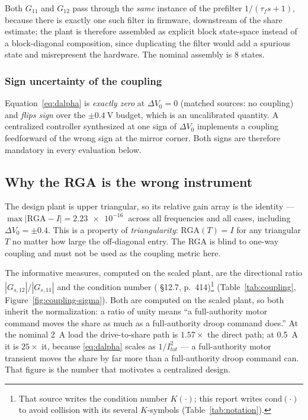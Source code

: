 \documentclass[energies,article,submit,pdftex,oneauthor]{Definitions/mdpi}
\begin{document}
Both $G_{11}$ and $G_{12}$ pass through the \emph{same} instance of the prefilter
$1/(\tau_f s+1)$, because there is exactly one such filter in firmware, downstream of the share
estimate; the plant is therefore assembled as explicit block state-space instead of a
block-diagonal composition, since duplicating the filter would add a spurious state and
misrepresent the hardware. The nominal assembly is 8 states.

\subsubsection{Sign uncertainty of the coupling}
Equation~\eqref{eq:dalpha} is \emph{exactly zero} at $\Delta V_0 = 0$ (matched sources: no
coupling) and \emph{flips sign} over the $\pm\SI{0.4}{\volt}$ budget, which is an uncalibrated
quantity. A centralized controller synthesized at one sign of $\Delta V_0$ implements a coupling
feedforward of the wrong sign at the mirror corner. Both signs are therefore mandatory in every
evaluation below.

\subsection{Why the RGA is the wrong instrument}

The design plant is upper triangular, so its relative gain array is the identity ---
$\max|\mathrm{RGA}-I| = \SI{2.23e-16}{}$ across all frequencies and all cases, including
$\Delta V_0 = \pm 0.4$. This is a property of \emph{triangularity}:
$\mathrm{RGA}(T)=I$ for any triangular $T$ no matter how large the off-diagonal entry. The RGA is
blind to one-way coupling and must not be used as the coupling metric here.

The informative measures, computed on the scaled plant, are the directional ratio
$|G_{s,12}|/|G_{s,11}|$ and the condition number
(\citep{assadian2020neoclassical} \S12.7, p.~414)\footnote{That source writes the condition
number $K(\cdot)$; this report writes $\mathrm{cond}(\cdot)$ to avoid collision with its several
$K$-symbols (Table~\ref{tab:notation}).} (Table~\ref{tab:coupling},
Figure~\ref{fig:coupling-sigma}). Both are computed on the scaled plant, so both inherit the
normalization: a ratio of unity means ``a full-authority motor command moves the share as much as
a full-authority droop command does.'' At the nominal \SI{2}{\ampere} load the drive-to-share path
is $1.57\times$ the direct path; at \SI{0.5}{\ampere} it is $25\times$ it, because
\eqref{eq:dalpha} scales as $1/I_{tot}^2$ --- a full-authority motor transient moves the
share by far more than a full-authority droop command can. That figure is the number that
motivates a centralized design.
\end{document}

